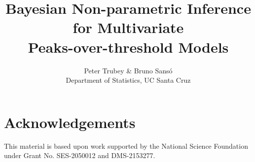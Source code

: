 \documentclass[entropy,article,submit,moreauthors]{Definitions/mdpi}
\title{Bayesian Non-parametric Inference for Multivariate\\ Peaks-over-threshold Models}
\author{Peter Trubey \& Bruno Sans\'{o}\\ Department of Statistics, UC Santa Cruz}
\theoremstyle{thmstyleone}
\begin{document}
\abstract{}

\maketitle











\section*{Acknowledgements}
This material is based upon work supported by the National Science Foundation
    under Grant No. SES-2050012 and DMS-2153277.



\end{document}
